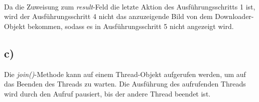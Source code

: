 \documentclass[ngerman]{fbi-aufgabenblatt}
\begin{document}
 \\
Da die Zuweisung zum \textit{result}-Feld die letzte Aktion des Ausführungsschritts 1 ist, wird der Ausführungsschritt 4 nicht das anzuzeigende Bild von dem Downloader-Objekt bekommen, sodass es in Ausführungsschritt 5 nicht angezeigt wird.
\subsection*{c)}
Die \textit{join()}-Methode kann auf einem Thread-Objekt aufgerufen werden, um auf das Beenden des Threads zu warten. Die Ausführung des aufrufenden Threads wird durch den Aufruf pausiert, bis der andere Thread beendet ist.
\end{document}
